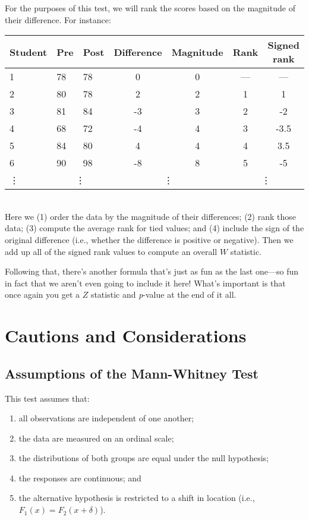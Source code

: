 For the purposes of this test, we will rank the scores based on the magnitude of their difference. For instance:\\[0.4cm]

\begin{tabular}{l l l | c c c c}
Student & Pre & Post & Difference & Magnitude & Rank & Signed rank \\
\hline
1 & 78 & 78 & 0 & 0 & --- & --- \\
2 & 80 & 78 & 2 & 2 & 1 & 1 \\
3 & 81 & 84 & -3 & 3 & 2 & -2 \\
4 & 68 & 72 & -4 & 4 & 3 & -3.5 \\
5 & 84 & 80 & 4 & 4 & 4 & 3.5 \\
6 & 90 & 98 & -8 & 8 & 5 & -5 \\
\vdots & \multicolumn{2}{c}{\vdots} & \multicolumn{2}{c}{\vdots} & \multicolumn{2}{c}{\vdots} \\
\end{tabular}\\[0.4cm]

Here we (1) order the data by the magnitude of their differences; (2) rank those data; (3) compute the average rank for tied values; and (4) include the sign of the original difference (i.e., whether the difference is positive or negative). Then we add up all of the signed rank values  to compute  an  overall  $W$  statistic.

Following  that,  there's  another  formula that's  just  as  fun  as the  last  one---so  fun in fact that we aren't even going to include  it here!  What's important  is that once again you get a $Z$ statistic and \textit{p}-value at the  end of  it  all.

\section{Cautions and Considerations}

\subsection{Assumptions of the Mann-Whitney Test}

This test assumes that:
\begin{enumerate}
\item all observations are independent of one another;
\item the data are measured on an ordinal scale;
\item the distributions of both groups are equal under the null hypothesis;
\item the responses are continuous; and
\item the alternative hypothesis is restricted to a shift in location (i.e., $F_1(x)=F_2(x+\delta)$).
\end{enumerate}

